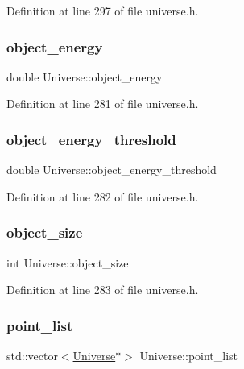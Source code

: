 Definition at line 297 of file universe.\+h.

\mbox{\label{class_universe_ab64777e25c83216e7a91d2761a10463c}} 
\subsubsection{\texorpdfstring{object\+\_\+energy}{object\_energy}}
{\footnotesize\ttfamily double Universe\+::object\+\_\+energy}



Definition at line 281 of file universe.\+h.

\mbox{\label{class_universe_a17c8d799331a5b32837f285c12cbe858}} 
\subsubsection{\texorpdfstring{object\+\_\+energy\+\_\+threshold}{object\_energy\_threshold}}
{\footnotesize\ttfamily double Universe\+::object\+\_\+energy\+\_\+threshold}



Definition at line 282 of file universe.\+h.

\mbox{\label{class_universe_a64f4f4025c9be1d84492c766a002a6d4}} 
\subsubsection{\texorpdfstring{object\+\_\+size}{object\_size}}
{\footnotesize\ttfamily int Universe\+::object\+\_\+size}



Definition at line 283 of file universe.\+h.

\mbox{\label{class_universe_a9dc8abd2f8f84318722184f38e1b8cc7}} 
\subsubsection{\texorpdfstring{point\+\_\+list}{point\_list}}
{\footnotesize\ttfamily std\+::vector$<$\hyperlink{class_universe}{Universe}$\ast$$>$ Universe\+::point\+\_\+list\hspace{0.3cm}{\ttfamily [protected]}}



